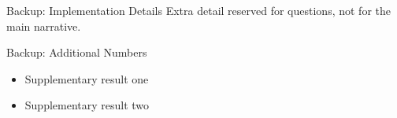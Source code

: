 \documentclass[aspectratio=169,11pt]{beamer}
\begin{document}

\appendix

\begin{frame}{Backup: Implementation Details}
  Extra detail reserved for questions, not for the main narrative.
\end{frame}

\begin{frame}{Backup: Additional Numbers}
  \begin{itemize}
    \item Supplementary result one
    \item Supplementary result two
  \end{itemize}
\end{frame}
\end{document}
